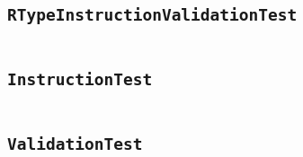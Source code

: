 
    \begin{landscape}
    \section{\texttt{RTypeInstructionValidationTest}}\label{code:RTypeInstructionValidationTest}
    \begin{multicols}{2} %
    \inputminted[mathescape,
        linenos,
        numbersep=5pt,
        frame=none,
        framesep=2mm,
        fontsize=\footnotesize]{java}{../src/main/test/java/se/filipallberg/dark/mips32decompiler/instruction/RTypeInstructionValidationTest.java}
    \end{multicols}
    \end{landscape}
    


    \begin{landscape}
    \section{\texttt{InstructionTest}}\label{code:InstructionTest}
    \begin{multicols}{2} %
    \inputminted[mathescape,
        linenos,
        numbersep=5pt,
        frame=none,
        framesep=2mm,
        fontsize=\footnotesize]{java}{../src/main/test/java/se/filipallberg/dark/mips32decompiler/instruction/InstructionTest.java}
    \end{multicols}
    \end{landscape}
    


    \begin{landscape}
    \section{\texttt{ValidationTest}}\label{code:ValidationTest}
    \begin{multicols}{2} %
    \inputminted[mathescape,
        linenos,
        numbersep=5pt,
        frame=none,
        framesep=2mm,
        fontsize=\footnotesize]{java}{../src/main/test/java/se/filipallberg/dark/mips32decompiler/instruction/ValidationTest.java}
    \end{multicols}
    \end{landscape}
    


